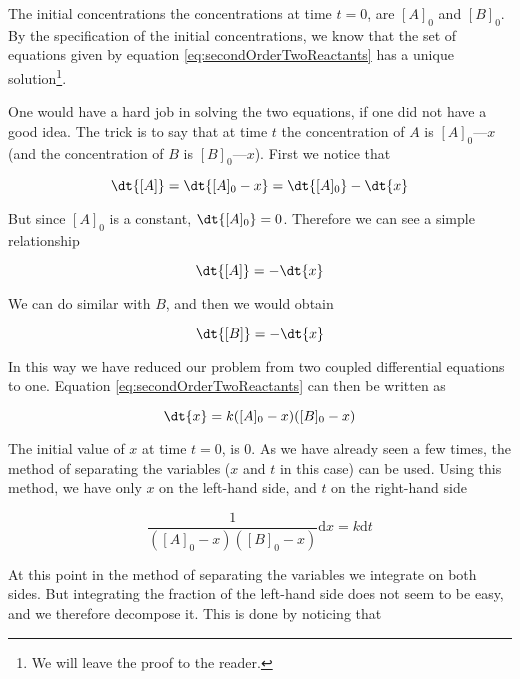 The initial concentrations \ie the concentrations at time $t = 0$, are $[A]_0$ and $[B]_0$. By the specification of the initial concentrations, we know that the set of equations given by equation \ref{eq:secondOrderTwoReactants} has a unique solution\footnote{We will leave the proof to the reader.}.

One would have a hard job in solving the two equations, if one did not have a good idea. The trick is to say that at time $t$ the concentration of $A$ is $[A]_0 — x$ (and the concentration of $B$ is $[B]_0 — x$). First we notice that

\begin{equation}
  \dt{[A]} = \dt{[A]_0 - x} = \dt{[A]_0} - \dt{x}
\end{equation}

But since $[A]_0$ is a constant, $\dt{[A]_0} = 0$. Therefore we can see a simple relationship

\begin{equation}
  \dt{[A]} = - \dt{x}
\end{equation}

We can do similar with $B$, and then we would obtain

\begin{equation}
  \dt{[B]} = - \dt{x}
\end{equation}

In this way we have reduced our problem from two coupled differential equations to one. Equation \ref{eq:secondOrderTwoReactants} can then be written as

\begin{equation}
  \dt{x} = k([A]_0 - x)([B]_0 - x)
\end{equation}

The initial value of $x$ \ie at time $t = 0$, is $0$. As we have already seen a few times, the method of separating the variables ($x$ and $t$ in this case) can be used. Using this method, we have only $x$ on the left-hand side, and $t$ on the right-hand side \ie

\begin{equation}
  \label{eq:secondOrderSeparateVars}
  \frac{1}{([A]_0 - x)([B]_0 - x)} \mathrm{d}x = k\mathrm{d}t
\end{equation}

At this point in the method of separating the variables we integrate on both sides. But integrating the fraction of the left-hand side does not seem to be easy, and we therefore decompose it. This is done by noticing that

